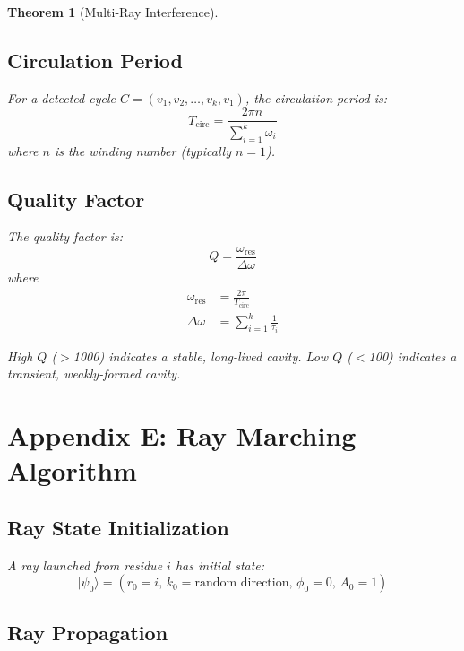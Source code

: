 \documentclass[11pt,a4paper]{article}
\newtheorem{theorem}{Theorem}[section]
\begin{document}
\begin{theorem}[Multi-Ray Interference]
\subsection{Circulation Period}

For a detected cycle $C = (v_1, v_2, \ldots, v_k, v_1)$, the circulation period is:
\begin{equation}
T_{\text{circ}} = \frac{2\pi n}{\sum_{i=1}^k \omega_i}
\end{equation}
where $n$ is the winding number (typically $n=1$).

\subsection{Quality Factor}

The quality factor is:
\begin{equation}
Q = \frac{\omega_{\text{res}}}{\Delta \omega}
\end{equation}
where
\begin{align}
\omega_{\text{res}} &= \frac{2\pi}{T_{\text{circ}}} \\
\Delta \omega &= \sum_{i=1}^k \frac{1}{\tau_i}
\end{align}

High $Q$ ($>$1000) indicates a stable, long-lived cavity. Low $Q$ ($<$100) indicates a transient, weakly-formed cavity.

\section{Appendix E: Ray Marching Algorithm}

\subsection{Ray State Initialization}

A ray launched from residue $i$ has initial state:
\begin{equation}
|\psi_0\rangle = (r_0 = i, \, k_0 = \text{random direction}, \, \phi_0 = 0, \, A_0 = 1)
\end{equation}

\subsection{Ray Propagation}


\end{theorem}
\end{document}
